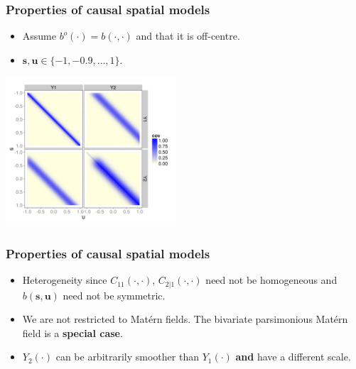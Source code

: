 \documentclass{beamer}
\newcommand{\svec} {\textbf{s}}
\newcommand{\uvec} {\textbf{u}}
\newcommand{\s}{\mathbf{s}}
\renewcommand{\u}{\mathbf{u}}
\begin{document}

\begin{frame}
\frametitle{Properties of causal spatial models}

\begin{itemize}
\item Assume $b^o(\cdot) = b(\cdot,\cdot)$ and that it is off-centre.
\item $\s,\u \in \{-1, -0.9 ,\dots, 1\}$.
\end{itemize}

\begin{center}
\includegraphics[width=2.5in]{Sigma.png}
\end{center}
\end{frame}


\begin{frame}
\frametitle{Properties of causal spatial models}

\begin{itemize}
\item Heterogeneity since $C_{11}(\cdot,\cdot)$, $C_{2|1}(\cdot,\cdot)$ need not be homogeneous and $b(\svec,\uvec)$ need not be symmetric. \vfill

\item We are not restricted to Matérn fields. The bivariate parsimonious Matérn field is a {\bf special case}.\vfill

\item $Y_2(\cdot)$ can be arbitrarily smoother than $Y_1(\cdot)$ {\bf and} have a different scale.\vfill

\end{itemize}
\end{frame}

\end{document}
